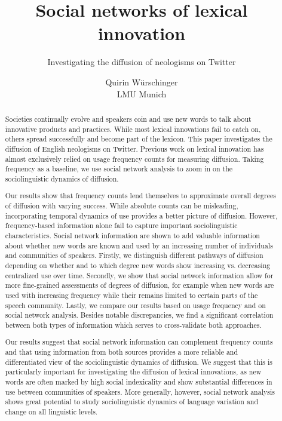 \documentclass[draft, a4paper, abstract=on]{scrartcl}
\begin{document}

  \title{Social networks of lexical innovation}
  \subtitle{Investigating the diffusion of neologisms on Twitter}
  \author{Quirin Würschinger\\ LMU Munich}
  \maketitle


\listoftodos

  \cleardoublepage

  \begin{abstract}

    Societies continually evolve and speakers coin and use new words to talk about innovative products and practices. While most lexical innovations fail to catch on, others spread successfully and become part of the lexicon. This paper investigates the diffusion of English neologisms on Twitter. Previous work on lexical innovation has almost exclusively relied on usage frequency counts for measuring diffusion. Taking frequency as a baseline, we use social network analysis to zoom in on the sociolinguistic dynamics of diffusion.

    Our results show that frequency counts lend themselves to approximate overall degrees of diffusion with varying success. While absolute counts can be misleading, incorporating temporal dynamics of use provides a better picture of diffusion. However, frequency-based information alone fail to capture important sociolinguistic characteristics. Social network information are shown to add valuable information about whether new words are known and used by an increasing number of individuals and communities of speakers. Firstly, we distinguish different pathways of diffusion depending on whether and to which degree new words show increasing vs. decreasing centralized use over time. Secondly, we show that social network information allow for more fine-grained assessments of degrees of diffusion, for example when new words are used with increasing frequency while their remains limited to certain parts of the speech community. Lastly, we compare our results based on usage frequency and on social network analysis. Besides notable discrepancies, we find a significant correlation between both types of information which serves to cross-validate both approaches.

    Our results suggest that social network information can complement frequency counts and that using information from both sources provides a more reliable and differentiated view of the sociolinguistic dynamics of diffusion. We suggest that this is particularly important for investigating the diffusion of lexical innovations, as new words are often marked by high social indexicality and show substantial differences in use between communities of speakers. More generally, however, social network analysis shows great potential to study sociolinguistic dynamics of language variation and change on all linguistic levels.



\end{abstract}
\end{document}
